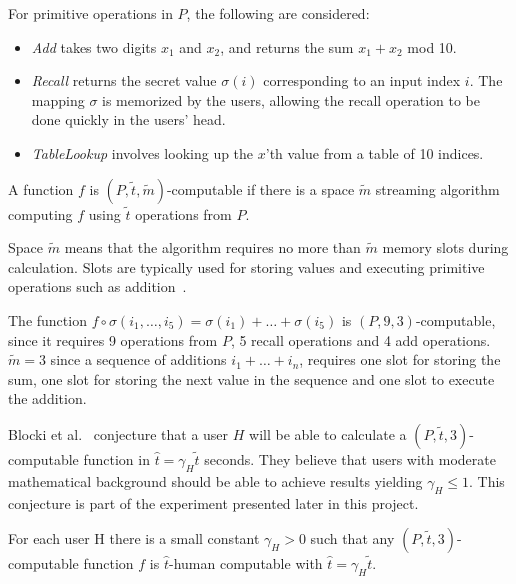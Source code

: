 \noindent For primitive operations in $P$, the following are considered:
\begin{itemize}
    \item \emph{Add} takes two digits $x_1$ and $x_2$, and returns the sum $x_1 + x_2$ mod 10.
    \item \emph{Recall} returns the secret value $\sigma(i)$ corresponding to an input index $i$. The mapping $\sigma$ is memorized by the users, allowing the recall operation to be done quickly in the users' head.
    \item \emph{TableLookup} involves looking up the $x$'th value from a table of 10 indices.
\end{itemize}


\begin{definition}
    \label{ptm-computable}
    A function $f$ is $(P, \tilde t, \tilde m)$-computable if there is a space $\tilde m$ streaming algorithm computing $f$ using $\tilde t$ operations from $P$.
\end{definition}
\begin{remark}
    Space $\tilde m$ means that the algorithm requires no more than $\tilde m$ memory slots during calculation. Slots are typically used for storing values and executing primitive operations such as addition~\cite{space-complexity}.
\end{remark}



\begin{example}
    The function $f \circ \sigma(i_1,\dots,i_5) = \sigma(i_1) + \dots + \sigma(i_5)$ is $(P,9,3)$-computable, since it requires 9 operations from $P$, 5 recall operations and 4 add operations. $\tilde m=3$ since a sequence of additions $i_1 + \dots + i_n$, requires one slot for storing the sum, one slot for storing the next value in the sequence and one slot to execute the addition.
\end{example}

\par Blocki et al.~\cite{hcp-blocki} conjecture that a user $H$ will be able to calculate a $( P, \tilde t, 3 )$-computable function in $\hat t = \gamma_H \tilde t$ seconds. They believe that users with moderate mathematical background should be able to achieve results yielding $\gamma_H \le 1$. This conjecture is part of the experiment presented later in this project. 


\begin{conjecture}\label{conjecture1}
    \cite{hcp-blocki} For each user H there is a small constant $\gamma_H > 0$ such that any $(P,\tilde t, 3)$-computable function $f$ is $\hat t$-human computable with $\hat t = \gamma_H \tilde t$.

\end{conjecture}

